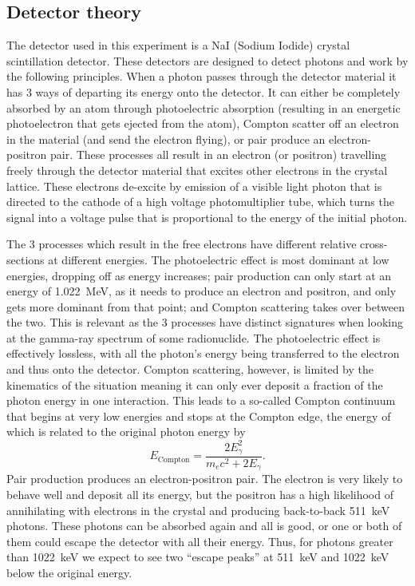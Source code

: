 \documentclass[11pt]{article}
\numberwithin{equation}{section}
\numberwithin{figure}{section}
\numberwithin{table}{section}
\begin{document}
\subsection{Detector theory}\label{sec:DetectorTheory}
The detector used in this experiment is a NaI (Sodium Iodide) crystal scintillation detector. These detectors are designed to detect photons and work by the following principles. When a photon passes through the detector material it has 3 ways of departing its energy onto the detector. It can either be completely absorbed by an atom through photoelectric absorption (resulting in an energetic photoelectron that gets ejected from the atom), Compton scatter off an electron in the material (and send the electron flying), or pair produce an electron-positron pair. These processes all result in an electron (or positron) travelling freely through the detector material that excites other electrons in the crystal lattice. These electrons de-excite by emission of a visible light photon that is directed to the cathode of a high voltage photomultiplier tube, which turns the signal into a voltage pulse that is proportional to the energy of the initial photon.

The 3 processes which result in the free electrons have different relative cross-sections at different energies. The photoelectric effect is most dominant at low energies, dropping off as energy increases; pair production can only start at an energy of \SI{1.022}{\mega\electronvolt}, as it needs to produce an electron and positron, and only gets more dominant from that point; and Compton scattering takes over between the two. This is relevant as the 3 processes have distinct signatures when looking at the gamma-ray spectrum of some radionuclide. The photoelectric effect is effectively lossless, with all the photon's energy being transferred to the electron and thus onto the detector. Compton scattering, however, is limited by the kinematics of the situation meaning it can only ever deposit a fraction of the photon energy in one interaction. This leads to a so-called Compton continuum that begins at very low energies and stops at the Compton edge, the energy of which is related to the original photon energy by 
\begin{equation}
    E_\mathrm{Compton}=\frac{2E_\gamma^2}{m_e c^2 + 2E_\gamma}.
\end{equation}
Pair production produces an electron-positron pair. The electron is very likely to behave well and deposit all its energy, but the positron has a high likelihood of annihilating with electrons in the crystal and producing back-to-back \SI{511}{\kilo\electronvolt} photons. These photons can be absorbed again and all is good, or one or both of them could escape the detector with all their energy. Thus, for photons greater than \SI{1022}{\kilo\electronvolt} we expect to see two ``escape peaks'' at \SI{511}{\kilo\electronvolt} and \SI{1022}{\kilo\electronvolt} below the original energy. 
\end{document}
